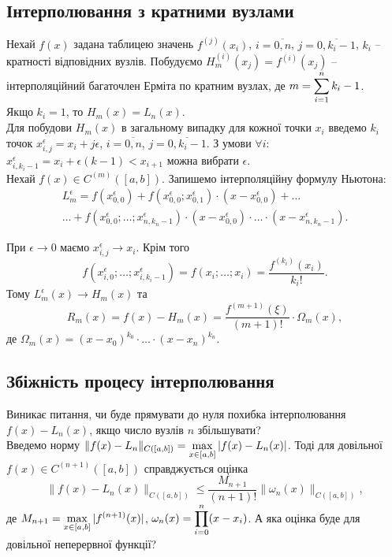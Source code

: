 \subsection{Інтерполювання з кратними вузлами}

Нехай $f(x)$ задана таблицею значень $f^{(j)}(x_i)$, $i=\overline{0,n}$, $j=\overline{0,k_i-1}$, $k_i$ -- кратності відповідних вузлів. Побудуємо $H_m^{(i)}(x_j) = f^{(i)}(x_j)$ -- інтерполяційний багаточлен Ерміта по кратним вузлах, де $m = \displaystyle\sum\limits_{i=1}^n k_i - 1$. \\

Якщо $k_i=1$, то $H_m(x) = L_n(x)$. \\

Для побудови $H_m(x)$ в загальному випадку для кожної точки $x_i$ введемо $k_i$ точок $x_{i,j}^\epsilon = x_i + j\epsilon$, $i=\overline{0,n}$, $j=\overline{0,k_i-1}$. З умови $\forall i$: $x_{i,k_i-1}^\epsilon = x_i + \epsilon(k-1) < x_{i+1}$ можна вибрати $\epsilon$. \\

Нехай $f(x) \in C^{(m)}([a,b])$. Запишемо інтерполяційну формулу Ньютона:
\begin{multline*} 
    L_m^\epsilon = f\left(x_{0,0}^\epsilon\right)+f\left(x_{0,0}^\epsilon;x_{0,1}^\epsilon\right)\cdot\left(x-x_{0,0}^\epsilon\right) + \ldots \\
    \ldots + f\left(x_{0,0}^\epsilon;\ldots;x_{n,k_n-1}^\epsilon\right)\cdot\left(x-x_{0,0}^\epsilon\right)\cdot\ldots\cdot\left(x-x_{n,k_n-1}^\epsilon\right).
\end{multline*}

При $\epsilon \to 0$ маємо $x_{i,j}^\epsilon \to x_i$. Крім того
\[f\left(x_{i,0}^\epsilon;\ldots;x_{i,k_i-1}^\epsilon\right)=f(x_i;\ldots;x_i)=\dfrac{f^{(k_i)}(x_i)}{k_i!}.\]
Тому $L_m^\epsilon(x)\to H_m(x)$ та
\[ R_m(x) = f(x) - H_m(x) = \dfrac{f^{(m+1)}(\xi)}{(m+1)!}\cdot \Omega_m(x),\]
де $\Omega_m(x) = (x-x_0)^{k_0}\cdot\ldots\cdot(x-x_n)^{k_n}$.

\subsection{Збіжність процесу інтерполювання}

Виникає питання, чи буде прямувати до нуля похибка інтерполювання $f(x) - L_n(x)$, якщо число вузлів $n$ збільшувати? \\

Введемо норму $\|f(x)-L_n\|_{C([a,b])} = \displaystyle\max\limits_{x\in[a,b]}|f(x)-L_n(x)|$. Тоді для довільної $f(x)\in C^{(n+1)}([a,b])$ справджується оцінка
\begin{equation}
    \label{eq:6.20}
    \| f(x) - L_n(x)\|_{C([a,b])} \le \dfrac{M_{n+1}}{(n+1)!}\|\omega_n(x)\|_{C([a,b])},
\end{equation}
де $M_{n+1} = \displaystyle\max\limits_{x\in[a,b]} |f^{(n+1)}(x)|$, $\omega_n(x) = \displaystyle\prod\limits_{i=0}^n (x-x_i)$. А яка оцінка буде для довільної неперервної функції? \\

